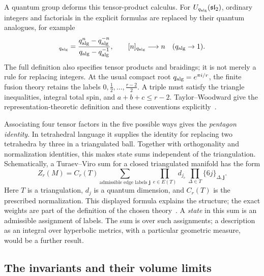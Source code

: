 A quantum group deforms this tensor-product calculus. For
$U_{q_{\rm alg}}(\mathfrak{sl}_2)$, ordinary integers and factorials in
the explicit formulas are replaced by their quantum analogues, for example
\begin{equation}
 [n]_{q_{\rm alg}}
 =\frac{q_{\rm alg}^{n}-q_{\rm alg}^{-n}}
        {q_{\rm alg}-q_{\rm alg}^{-1}},\qquad
 [n]_{q_{\rm alg}}\longrightarrow n\quad(q_{\rm alg}\to1).
 \label{eq:introqinteger}
\end{equation}
The full definition also specifies tensor products and braidings; it
is not merely a rule for replacing integers. At the usual compact
root $q_{\rm alg}=e^{\pi i/r}$, the finite fusion theory retains the
labels $0,\frac12,\ldots,\frac{r-2}{2}$. A triple must satisfy the
triangle inequalities, integral total spin, and
$a+b+c\le r-2$. Taylor--Woodward give the representation-theoretic
definition and these conventions explicitly~\cite{TaylorWoodward}.

Associating four tensor factors in the five possible ways gives the
\emph{pentagon identity}. In tetrahedral language it supplies the
identity for replacing two tetrahedra by three in a triangulated ball.
Together with orthogonality and normalization identities, this makes
state sums independent of the triangulation. Schematically, a
Turaev--Viro sum for a closed triangulated manifold has the form
\begin{equation}
 Z_r(M)=C_r(T)\sum_{\text{admissible edge labels }\mathbf j}
       \prod_{e\in E(T)}d_{j_e}\,
       \prod_{\Delta\in T}\{6j\}_{\Delta,\mathbf j}.
 \label{eq:introstatesum}
\end{equation}
Here $T$ is a triangulation, $d_j$ is a quantum dimension, and $C_r(T)$
is the prescribed normalization. This displayed formula explains the
structure; the exact weights are part of the definition of the chosen
theory~\cite[Sections 2.2--2.3]{ChenYang}. A \emph{state} in this sum
is an admissible assignment of labels. The sum is over such assignments;
a description as an integral over hyperbolic metrics, with a particular
geometric measure, would be a further result.

\subsection{The invariants and their volume limits}
\label{sec:introinvariants}

